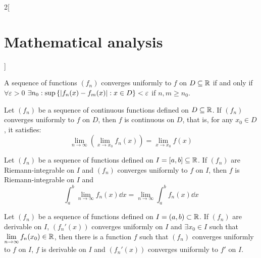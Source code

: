 \documentclass[../../../main_math.tex]{subfiles}
\begin{document}
\begin{multicols}{2}[\section{Mathematical analysis}]
  \begin{theorem}
    A sequence of functions $(f_n)$ converges uniformly to $f$ on $D\subseteq\mathbb{R} $ if and only if $\forall\varepsilon>0$ $\displaystyle\exists n_0:\sup\left\{|f_n(x)-f_m(x)|:\\ x\in D\right\}< \varepsilon$ if $n,m\geq n_0$.
  \end{theorem}
  \begin{theorem}
    Let $(f_n)$ be a sequence of continuous functions defined on $D\subseteq\mathbb{R} $. If $(f_n)$ converges uniformly to $f$ on $D$, then $f$ is continuous on $D$, that is, for any $x_0\in D$, it satisfies: $$\lim_{n\to\infty}\left(\lim_{x\to x_0} f_n(x)\right)=\lim_{x\to x_0} f(x)$$
  \end{theorem}
  \begin{theorem}
    Let $(f_n)$ be a sequence of functions defined on  $I=[a,b]\subseteq\mathbb{R} $. If $(f_n)$ are Riemann-integrable on $I$ and $(f_n)$ converges uniformly to $f$ on $I$, then $f$ is Riemann-integrable on $I$ and $$\int_a^b\lim_{n\to\infty} f_n(x) \dd{x}=\lim_{n\to\infty} \int_a^bf_n(x) \dd{x}$$
  \end{theorem}
  \begin{theorem}
    Let $(f_n)$ be a sequence of functions defined on $I=(a,b)\subset\mathbb{R} $. If $(f_n)$ are derivable on $I$, $(f_n'(x))$ converges uniformly on $I$ and $\exists x_0\in I$ such that $\displaystyle\lim_{n\to\infty}f_n(x_0)\in\mathbb{R} $, then there is a function $f$ such that $(f_n)$ converges uniformly to $f$ on $I$, $f$ is derivable on $I$ and $(f_n'(x))$ converges uniformly to $f'$ on $I$.
  \end{theorem}

\end{multicols}
\end{document}
